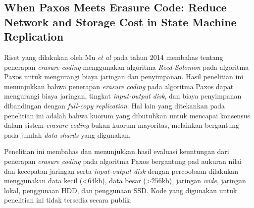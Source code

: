\subsection{When Paxos Meets Erasure Code: Reduce Network and Storage Cost in State Machine Replication}
\label{subsection:paxos-erasure}

Riset yang dilakukan oleh Mu \textit{et al} pada tahun 2014 \parencite{mu2014paxos} membahas tentang penerapan \textit{erasure coding} menggunakan algoritma \textit{Reed-Solomon} pada algoritma Paxos untuk mengurangi biaya jaringan dan penyimpanan. Hasil penelitian ini menunjukkan bahwa penerapan \textit{erasure coding} pada algoritma Paxos dapat mengurangi biaya jaringan, tingkat \textit{input-output disk}, dan biaya penyimpanan dibandingan dengan \textit{full-copy replication}. Hal lain yang ditekankan pada penelitian ini adalah bahwa kuorum yang dibutuhkan untuk mencapai konsensus dalam sistem \textit{erasure coding} bukan kuorum mayoritas, melainkan bergantung pada jumlah \textit{data shards} yang digunakan.

Penelitian ini membahas dan menunjukkan hasil evaluasi keuntungan dari penerapan \textit{erasure coding} pada algoritma Paxos bergantung pad aukuran nilai dan kecepatan jaringan serta \textit{input-output disk} dengan percoobaan dilakukan menggunakan data kecil (<64kb), data besar (>256kb), jaringan \textit{wide}, jaringan lokal, penggunaan HDD, dan penggunaan SSD. Kode yang digunakan untuk penelitian ini tidak tersedia secara publik.